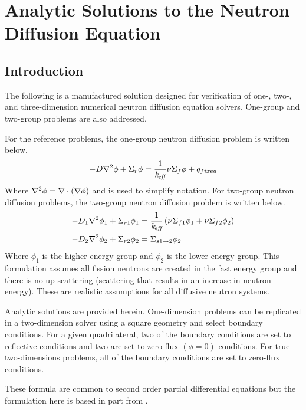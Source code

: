 \chapter{Analytic Solutions to the Neutron Diffusion Equation}
\label{ap:analyticSolutions}

\section{Introduction}
  The following is a manufactured solution designed for verification of one-,
  two-, and three-dimension numerical neutron diffusion equation solvers.
  One-group and two-group problems are also addressed.
  
  For the reference problems, the one-group neutron diffusion problem is written
  below.
  \begin{equation} \label{eq:onegroup}
    -D \mathbf{\nabla}^2 \phi + \Sigma_r \phi =  \frac{1}{k_{\!\mbox{\scriptsize \em eff}}} \nu \Sigma_f \phi + 
      q_{fixed}
  \end{equation}
  Where $\mathbf{\nabla}^2 \phi = \mathbf{\nabla} \cdot (\mathbf{\nabla} \phi)$ and is used to simplify 
  notation. For two-group neutron diffusion problems, the two-group neutron 
  diffusion problem is written below.
  \begin{align} 
    \label{eq:twogroup1}
    -D_1 \mathbf{\nabla}^2 \phi_1 + \Sigma_{r1} \phi_1 &= \frac{1}{k_{\!\mbox{\scriptsize \em eff}}} \left(
      \nu \Sigma_{f1} \phi_1 + \nu \Sigma_{f2} \phi_2 \right) \\
    \label{eq:twogroup2}
    -D_2 \mathbf{\nabla}^2 \phi_2 + \Sigma_{r2} \phi_2 &= 
      \Sigma_{s 1 \rightarrow 2} \phi_2
  \end{align}
  Where $\phi_1$ is the higher energy group and $\phi_2$ is the lower energy 
  group. This formulation assumes all fission neutrons are created in the fast 
  energy group and there is no up-scattering (scattering that results in an 
  increase in neutron energy). These are realistic assumptions for all diffusive
  neutron systems.

  Analytic solutions are provided herein. One-dimension problems can be 
  replicated in a two-dimension solver using a square geometry and select 
  boundary conditions. For a given quadrilateral, two of the boundary conditions
  are set to reflective conditions and two are set to zero-flux $(\phi = 0)$ 
  conditions. For true two-dimensions problems, all of the boundary conditions 
  are set to zero-flux conditions.
  
  These formula are common to second order partial differential equations but
  the formulation here is based in part from \cite{textbooklewis}.


